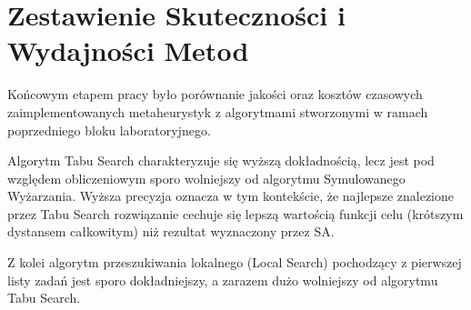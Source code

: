 \documentclass[12pt,a4paper]{article}
\begin{document}
\section{Zestawienie Skuteczności i Wydajności Metod}
Końcowym etapem pracy było porównanie jakości oraz kosztów czasowych zaimplementowanych metaheurystyk z algorytmami stworzonymi w ramach poprzedniego bloku laboratoryjnego.

Algorytm Tabu Search charakteryzuje się wyższą dokładnością, lecz jest pod względem obliczeniowym sporo wolniejszy od algorytmu Symulowanego Wyżarzania. Wyższa precyzja oznacza w tym kontekście, że najlepsze znalezione przez Tabu Search rozwiązanie cechuje się lepszą wartością funkcji celu (krótszym dystansem całkowitym) niż rezultat wyznaczony przez SA.

Z kolei algorytm przeszukiwania lokalnego (Local Search) pochodzący z pierwszej listy zadań jest sporo dokładniejszy, a zarazem dużo wolniejszy od algorytmu Tabu Search.
\end{document}
